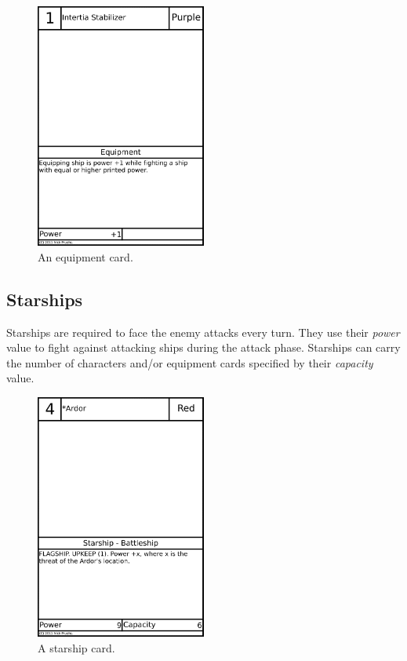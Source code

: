 \documentclass[11pt, a4paper]{article}
\begin{document}
\begin{figure}
  \centering
  \includegraphics[width=0.5\textwidth]{exampleequipment.png}
  \caption{An equipment card.}
\end{figure}

\subsection{Starships}

Starships are required to face the enemy attacks every turn. They use their
\emph{power} value to fight against attacking ships during the attack phase.
Starships can carry the number of characters and/or equipment cards specified by
their \emph{capacity} value.

\begin{figure}
  \centering
  \includegraphics[width=0.5\textwidth]{examplestarship.png}
  \caption{A starship card.}
\end{figure}
\end{document}

